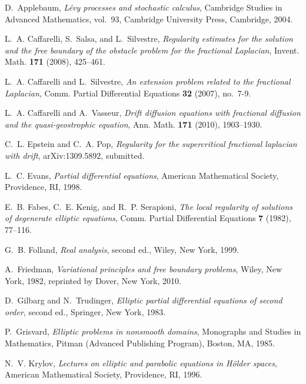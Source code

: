 \documentclass[11pt,reqno]{amsart}
\theoremstyle{definition}
\theoremstyle{remark}
\begin{document}
\begin{thebibliography}{10}

D.~Applebaum, \emph{L\'evy processes and stochastic calculus}, Cambridge
  Studies in Advanced Mathematics, vol.~93, Cambridge University Press,
  Cambridge, 2004.

L.~A. Caffarelli, S.~Salsa, and L.~Silvestre, \emph{Regularity estimates for
  the solution and the free boundary of the obstacle problem for the fractional
  {L}aplacian}, Invent. Math. \textbf{171} (2008), 425--461.

L.~A. Caffarelli and L.~Silvestre, \emph{An extension problem related to the
  fractional {L}aplacian}, Comm. Partial Differential Equations \textbf{32}
  (2007), no.~7-9.

L.~A. Caffarelli and A.~Vasseur, \emph{Drift diffusion equations with
  fractional diffusion and the quasi-geostrophic equation}, Ann. Math.
  \textbf{171} (2010), 1903--1930.

C.~L. Epstein and C.~A. Pop, \emph{Regularity for the supercritical fractional
  laplacian with drift}, arXiv:1309.5892, submitted.

L.~C. Evans, \emph{Partial differential equations}, American Mathematical
  Society, Providence, RI, 1998.

E.~B. Fabes, C.~E. Kenig, and R.~P. Serapioni, \emph{The local regularity of
  solutions of degenerate elliptic equations}, Comm. Partial Differential
  Equations \textbf{7} (1982), 77--116.

G.~B. Folland, \emph{Real analysis}, second ed., Wiley, New York, 1999.

A.~Friedman, \emph{Variational principles and free boundary problems}, Wiley,
  New York, 1982, reprinted by Dover, New York, 2010.

D.~Gilbarg and N.~Trudinger, \emph{Elliptic partial differential equations of
  second order}, second ed., Springer, New York, 1983.

P.~Grisvard, \emph{Elliptic problems in nonsmooth domains}, Monographs and
  Studies in Mathematics, Pitman (Advanced Publishing Program), Boston, MA,
  1985.

N.~V. Krylov, \emph{Lectures on elliptic and parabolic equations in {H}\"older
  spaces}, American Mathematical Society, Providence, RI, 1996.


\end{thebibliography}
\end{document}
